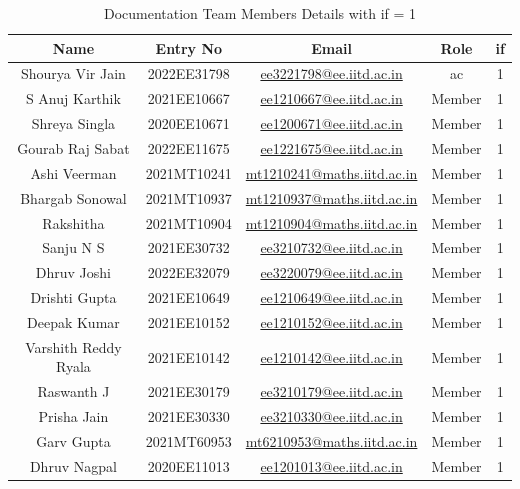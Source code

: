 \documentclass[12pt]{article} %
\begin{document}
\begin{table}[h!]
\centering
\begin{tabular}{|c|c|c|c|c|}
\hline
Name & Entry No & Email & Role & \acrshort{if} \\
\hline
Shourya Vir Jain & 2022EE31798 & \href{mailto:ee3221798@ee.iitd.ac.in}{ee3221798@ee.iitd.ac.in} & \acrshort{ac} & 1 \\
S Anuj Karthik & 2021EE10667 & \href{mailto:ee1210667@ee.iitd.ac.in}{ee1210667@ee.iitd.ac.in} & Member & 1 \\
Shreya Singla & 2020EE10671 & \href{mailto:ee1200671@ee.iitd.ac.in}{ee1200671@ee.iitd.ac.in} & Member & 1 \\
Gourab Raj Sabat & 2022EE11675 & \href{mailto:ee1221675@ee.iitd.ac.in}{ee1221675@ee.iitd.ac.in} & Member & 1 \\
Ashi Veerman & 2021MT10241 & \href{mailto:mt1210241@maths.iitd.ac.in}{mt1210241@maths.iitd.ac.in} & Member & 1 \\
Bhargab Sonowal & 2021MT10937 & \href{mailto:mt1210937@maths.iitd.ac.in}{mt1210937@maths.iitd.ac.in} & Member & 1 \\
Rakshitha & 2021MT10904 & \href{mailto:mt1210904@maths.iitd.ac.in}{mt1210904@maths.iitd.ac.in} & Member & 1 \\
Sanju N S & 2021EE30732 & \href{mailto:ee3210732@ee.iitd.ac.in}{ee3210732@ee.iitd.ac.in} & Member & 1 \\
Dhruv Joshi & 2022EE32079 & \href{mailto:ee3222079@ee.iitd.ac.in}{ee3220079@ee.iitd.ac.in} & Member & 1 \\
Drishti Gupta & 2021EE10649 & \href{mailto:ee1210649@ee.iitd.ac.in}{ee1210649@ee.iitd.ac.in} & Member & 1 \\
Deepak Kumar & 2021EE10152 & \href{mailto:ee1210152@ee.iitd.ac.in}{ee1210152@ee.iitd.ac.in} & Member & 1 \\
Varshith Reddy Ryala & 2021EE10142 & \href{mailto:ee1210142@ee.iitd.ac.in}{ee1210142@ee.iitd.ac.in} & Member & 1 \\
Raswanth J & 2021EE30179 & \href{mailto:ee3210179@ee.iitd.ac.in}{ee3210179@ee.iitd.ac.in} & Member & 1 \\
Prisha Jain & 2021EE30330 & \href{mailto:ee3210330@ee.iitd.ac.in}{ee3210330@ee.iitd.ac.in} & Member & 1 \\
Garv Gupta & 2021MT60953 & \href{mailto:mt6210953@maths.iitd.ac.in}{mt6210953@maths.iitd.ac.in} & Member & 1 \\
Dhruv Nagpal & 2020EE11013 & \href{mailto:ee1201013@ee.iitd.ac.in}{ee1201013@ee.iitd.ac.in} & Member & 1 \\
\hline
\end{tabular}
\caption{Documentation Team Members Details with \acrshort{if} = 1}
\label{tab:teamDetails}
\end{table}
\end{document}
